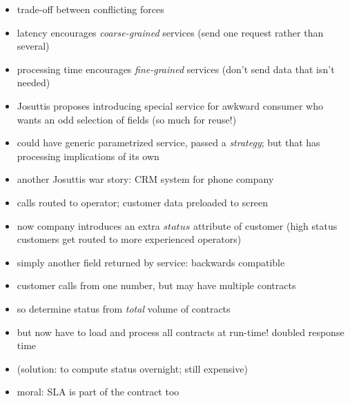 \documentclass{sepslide-soa-faked} %
\begin{document}
\begin{slide}
\begin{itemize}
\item trade-off between conflicting forces
\item latency encourages \emph{coarse-grained} services 
(send one request rather than several)
\item processing time encourages \emph{fine-grained} services
(don't send data that isn't needed)
\item Josuttis proposes introducing special service for awkward consumer who wants an odd selection of fields
(so much for reuse!)
\item could have generic parametrized service, passed a \emph{strategy}; but that has processing implications of its own
\end{itemize}
\end{slide}

\begin{slide}
\begin{itemize}
\item another Josuttis war story: CRM system for phone company
\item calls routed to operator; customer data preloaded to screen
\item now company introduces an extra $status$ attribute of customer
(high status customers get routed to more experienced operators)
\item simply another field returned by service: backwards compatible
\medskip
\item customer calls from one number, but may have multiple contracts
\item so determine status from \emph{total} volume of contracts
\item but now have to load and process all contracts at run-time! doubled response time
\item (solution: to compute status overnight; still expensive)
\item moral: SLA is part of the contract too
\end{itemize}
\end{slide}

\end{document}
